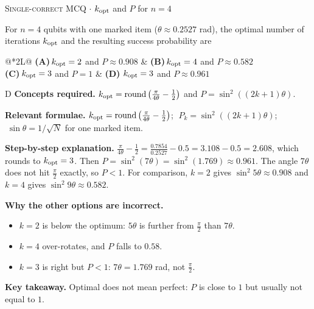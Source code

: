 \documentclass[11pt,a4paper]{article}
\newcommand{\optlabel}[1]{\textbf{(#1)}}
\newcommand{\correctlabel}[1]{\textcolor{okgreen}{\textbf{(#1)}\,\ding{51}}}
\newenvironment{qitem}[1]{\begin{list}{}{\setlength{\leftmargin}{3.3em}\setlength{\labelwidth}{3.1em}%
  \setlength{\labelsep}{0.2em}\setlength{\topsep}{3pt}\setlength{\parsep}{3pt}}\item[\textbf{Q.#1}\hfill]}{\end{list}}
\newcommand{\qsep}{\par\vspace{2pt}{\color{black!15}\hrule}\vspace{4pt}}
\newcommand{\qmeta}[2]{{\footnotesize\color{black!60}\textsc{#1} \;$\cdot$\; #2}\par}
\begin{document}
\begin{qitem}{43}
\qmeta{Single-correct MCQ}{$k_{\rm opt}$ and $P$ for $n = 4$}
For $n = 4$ qubits with one marked item ($\theta \approx 0.2527$ rad), the optimal number of iterations $k_{\rm opt}$ and the resulting success probability are
\par\smallskip\noindent\begin{tabularx}{\linewidth}{@{}*{2}{L}@{}}
\optlabel{A}\,$k_{\rm opt} = 2$ and $P \approx 0.908$ & \optlabel{B}\,$k_{\rm opt} = 4$ and $P \approx 0.582$ \\[3pt]
\optlabel{C}\,$k_{\rm opt} = 3$ and $P = 1$ & \correctlabel{D}\,$k_{\rm opt} = 3$ and $P \approx 0.961$
\end{tabularx}
\end{qitem}
\begin{solbox}{D}
\textbf{\color{brand}Concepts required.} $k_{\rm opt} = \operatorname{round}\big(\frac{\pi}{4\theta} - \frac12\big)$ and $P = \sin^2((2k+1)\theta)$.

\textbf{\color{brand}Relevant formulae.} $k_{\rm opt} = \operatorname{round}\big(\frac{\pi}{4\theta} - \frac12\big)$; $\;P_k = \sin^2((2k+1)\theta)$; $\;\sin\theta = 1/\sqrt N$ for one marked item.

\textbf{\color{brand}Step-by-step explanation.} $\frac{\pi}{4\theta} - \frac12 = \frac{0.7854}{0.2527} - 0.5 = 3.108 - 0.5 = 2.608$, which rounds to $k_{\rm opt} = 3$. Then
$P = \sin^2(7\theta) = \sin^2(1.769) \approx 0.961$. The angle $7\theta$ does not hit $\frac\pi2$ exactly, so $P < 1$.
For comparison, $k = 2$ gives $\sin^2 5\theta \approx 0.908$ and $k = 4$ gives $\sin^2 9\theta \approx 0.582$.

\textbf{\color{brand}Why the other options are incorrect.}
\begin{itemize}[leftmargin=2.4em, itemsep=1pt, topsep=2pt]
\item[\textbf{(A)}] $k = 2$ is below the optimum: $5\theta$ is further from $\frac\pi2$ than $7\theta$.
\item[\textbf{(B)}] $k = 4$ over-rotates, and $P$ falls to $0.58$.
\item[\textbf{(C)}] $k = 3$ is right but $P < 1$: $7\theta = 1.769$ rad, not $\frac\pi2$.
\end{itemize}
\textbf{\color{brand}Key takeaway.} Optimal does not mean perfect: $P$ is close to $1$ but usually not equal to $1$.
\end{solbox}
\qsep
\end{document}
